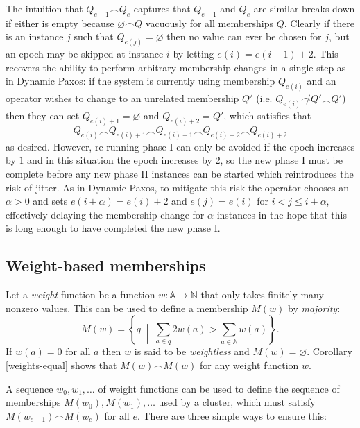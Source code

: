 \documentclass[journal]{IEEEtran}
\begin{document}
The intuition that $Q_{e-1} \frown Q_e$ captures that $Q_{e-1}$ and $Q_e$ are
similar breaks down if either is empty because $\varnothing \frown Q$ vacuously
for all memberships $Q$. Clearly if there is an instance $j$ such that
$Q_{e(j)} = \varnothing$ then no value can ever be chosen for $j$, but an epoch
may be skipped at instance $i$ by letting $e(i) = e(i-1) + 2$.  This recovers
the ability to perform arbitrary membership changes in a single step as in
Dynamic Paxos: if the system is currently using membership $Q_{e(i)}$ and an
operator wishes to change to an unrelated membership $Q'$ (i.e.  $Q_{e(i)}
\not\frown Q' \frown Q'$) then they can set $Q_{e(i)+1} = \varnothing$ and
$Q_{e(i)+2} = Q'$, which satisfies that \[Q_{e(i)} \frown Q_{e(i) + 1} \frown
Q_{e(i)+1} \frown Q_{e(i) + 2} \frown Q_{e(i) + 2}\] as desired. However,
re-running phase I can only be avoided if the epoch increases by $1$ and in
this situation the epoch increases by $2$, so the new phase I must be complete
before any new phase II instances can be started which reintroduces the risk of
jitter.  As in Dynamic Paxos, to mitigate this risk the operator chooses an
$\alpha > 0$ and sets $e(i+\alpha) = e(i)+2$ and $e(j) = e(i)$ for $i < j \le i
+ \alpha$, effectively delaying the membership change for $\alpha$ instances in
the hope that this is long enough to have completed the new phase I.

\subsection{Weight-based memberships}
\label{weight-based-memberships}

Let a \textit{weight} function be a function $w : \mathbb A \to \mathbb N$ that
only takes finitely many nonzero values. This can be used to define a
membership $M(w)$ by \textit{majority}: \[M(w) = \left\{ q \;\middle|\; \sum_{a
\in q} 2 w(a) > \sum_{a \in \mathbb A} w(a) \right\}.\] If $w(a) = 0$ for all
$a$ then $w$ is said to be \textit{weightless} and $M(w) = \varnothing$.
Corollary \ref{weights-equal} shows that $M(w) \frown M(w)$ for any weight
function $w$.

A sequence $w_0, w_1, \ldots$ of weight functions can be used to define the
sequence of memberships $M(w_0), M(w_1), \ldots$ used by a cluster, which must
satisfy $M(w_{e-1}) \frown M(w_e)$ for all $e$.  There are three simple ways to
ensure this:
\end{document}
